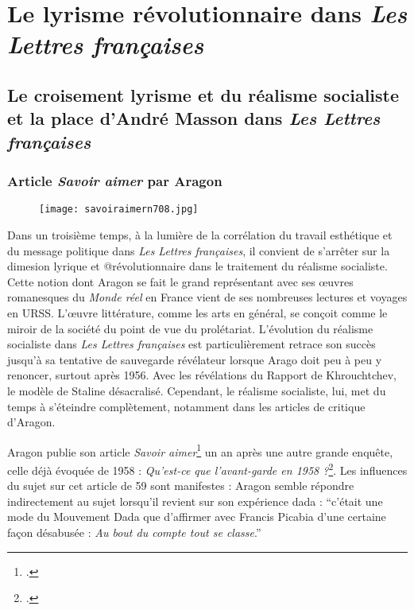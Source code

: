 \chapter{Le lyrisme révolutionnaire dans \emph{Les Lettres françaises} }

\section{Le croisement lyrisme  et du réalisme socialiste et la place d’André Masson dans \emph{Les Lettres françaises}}

\subsection{Article \emph{Savoir aimer} par Aragon}
 
 \begin{figure}[H]
   \centering
   \texttt{[image: savoiraimern708.jpg]}
	\caption{\cite{savoiraimer}}\label{fig:Savoiraimer}
\end{figure}


Dans un troisième temps, à la lumière de la corrélation du travail esthétique et du message politique dans \emph{Les Lettres françaises}, il convient de s'arrêter sur la dimesion lyrique et @révolutionnaire dans le traitement du réalisme socialiste. Cette notion dont Aragon se fait le grand représentant avec ses \oe{}uvres romanesques du \emph{Monde réel} en France vient de ses nombreuses lectures et voyages en URSS. L'\oe{}uvre littérature, comme les arts en général, se conçoit comme le miroir de la société du point de vue du prolétariat. L'évolution du réalisme socialiste dans \emph{Les Lettres françaises} est particulièrement retrace son succès jusqu'à sa tentative de sauvegarde révélateur lorsque Arago doit peu à peu y renoncer, surtout après 1956. Avec les révélations du Rapport de Khrouchtchev, le modèle de Staline désacralisé. Cependant, le réalisme socialiste, lui, met du temps à s’éteindre complètement, notamment dans les articles de critique d’Aragon. 

	 Aragon publie son article \emph{Savoir aimer}\footcite{savoiraimer} un an après une autre grande enquête, celle déjà évoquée de 1958 : \emph{Qu’est-ce que l’avant-garde en 1958 ?}\footcite{avantgarde}. Les influences du sujet sur cet article de 59 sont manifestes : Aragon semble répondre indirectement au sujet lorsqu’il revient sur son expérience dada : \enquote{c’était une mode du Mouvement Dada que d’affirmer avec Francis Picabia d’une certaine façon désabusée : \emph{Au bout du compte tout se classe}.}



